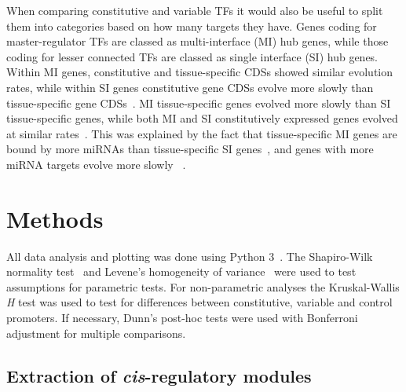 \documentclass[../main.tex]{subfiles}
\begin{document}
When comparing constitutive and variable TFs it would also be useful to split them into categories based on how many targets they have. 
Genes coding for master-regulator TFs are classed as multi\hyp{}interface (MI) hub genes, while those coding for lesser connected TFs are classed as single interface (SI) hub genes.
Within MI genes, constitutive and tissue-specific CDSs showed similar evolution rates, while within SI genes constitutive gene CDSs evolve more slowly than tissue-specific gene CDSs~\autocite{podderMultifunctionalityDominantlyDetermines2009}.
MI tissue-specific genes evolved more slowly than SI tissue-specific genes, while both MI and SI constitutively expressed genes evolved at similar rates~\autocite{biswasEvolutionaryRateHeterogeneity2018}.
This was explained by the fact that tissue-specific MI genes are bound by more miRNAs than tissue-specific SI genes~\autocite{biswasEvolutionaryRateHeterogeneity2018}, and genes with more miRNA targets evolve more slowly ~\autocite{chengRelationshipEvolutionMicroRNA2009}.

\section{Methods}
\label{chapter1:methods}

All data analysis and plotting was done using Python 3~\autocite{pythoncoreteamPythonDynamicOpen2020}.
The Shapiro\hyp{}Wilk normality test~\autocite{shapiroAnalysisVarianceTest1965} and Levene's homogeneity of variance~\autocite{leveneRobustTestsEquality1960} were used to test assumptions for parametric tests.
For non\hyp{}parametric analyses the Kruskal\hyp{}Wallis \textit{H} test \autocite{kruskalUseRanksOneCriterion1952} was used to test for differences between constitutive, variable and control promoters.
If necessary, Dunn's post\hyp{}hoc tests \autocite{dunnMultipleComparisonsUsing1964} were used with Bonferroni adjustment for multiple comparisons.

\subsection{Extraction of \textit{cis}-regulatory modules}\label{chapter1:methods:extraction-of-cis-regulatory-modules}
\end{document}
